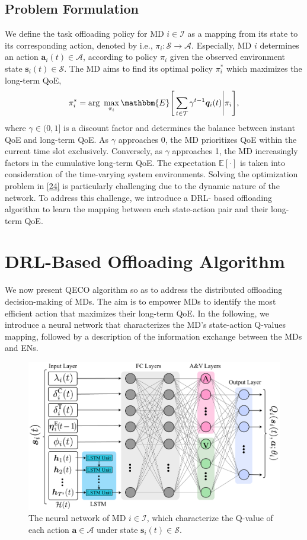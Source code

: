 \documentclass[12pt,draftclsnofoot,onecolumn]{IEEEtran}
\begin{document}
\subsection{Problem Formulation}
We define the task offloading policy for MD $i \in \mathcal{I}$ as a mapping from its state to its corresponding action, denoted by i.e., $\pi_i : \mathcal{S} \rightarrow \mathcal{A}$. Especially, MD $i$ determines an action $\boldsymbol{a}_i(t) \in \mathcal{A}$, according to policy $\pi_i$ given the observed environment state $\boldsymbol{s}_i(t) \in \mathcal{S}$. The MD aims to find its optimal policy $\pi_i^*$ which maximizes the long-term QoE,
\begin{alignat}{1}
	\pi_i^* = \text{arg}\,\,  \max\limits_{\pi_i}  \mathbbm{E} \Bigg[ \sum\limits_{t \in \mathcal{T}}  \gamma^{t-1}\boldsymbol{q}_i(t) \Bigg| \pi_i \Bigg],
	\label{24}  
\end{alignat}
where $\gamma \in (0,1]$ is a discount factor and determines the balance between instant QoE and long-term QoE. As $\gamma$ approaches 0, the MD prioritizes QoE within the current time slot exclusively. Conversely, as $\gamma$ approaches 1, the MD increasingly factors in the cumulative long-term QoE. The expectation $\mathbb{E}[\cdot]$ is taken into consideration of the time-varying system environments. Solving the optimization problem in \eqref{24} is particularly challenging due to the dynamic nature of the network. To address this challenge, we introduce a DRL- based offloading algorithm to learn the mapping between each state-action pair and their long-term QoE.
\section{DRL-Based Offloading Algorithm} \label{section:IV}
We now present QECO algorithm so as to address the distributed offloading decision-making of MDs. The aim is to empower MDs to identify the most efficient action that maximizes their long-term QoE. In the following, we introduce a neural network that characterizes the MD's state-action Q-values mapping, followed by a description of the information exchange between the MDs and ENs.

\begin{figure}
	\centering
	\includegraphics[width=0.7\linewidth]{Fig/DQN}
	\captionsetup{name=Fig.}
	
	\caption{The neural network of MD $i \in \mathcal{I}$, which characterize the Q-value of each action $\boldsymbol{a} \in \mathcal{A}$ under state $\boldsymbol{s}_i(t) \in \mathcal{S}$.}
	\vspace*{-4.5mm}
	\label{DQN}
\end{figure}
\end{document}
